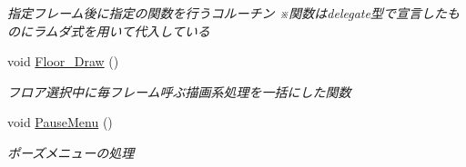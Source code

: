 \begin{DoxyCompactItemize}
\begin{DoxyCompactList}\small\item\em 指定フレーム後に指定の関数を行うコルーチン ※関数はdelegate型で宣言したものにラムダ式を用いて代入している \end{DoxyCompactList}\item 
void \hyperlink{class_stage_select_a048ef71453d75c2e3e20f7d6a189d060}{Floor\+\_\+\+Draw} ()
\begin{DoxyCompactList}\small\item\em フロア選択中に毎フレーム呼ぶ描画系処理を一括にした関数 \end{DoxyCompactList}\item 
void \hyperlink{class_stage_select_a8a9239efe529afbcf0d22f3af01f9436}{Pause\+Menu} ()
\begin{DoxyCompactList}\small\item\em ポーズメニューの処理 \end{DoxyCompactList}\end{DoxyCompactItemize}
